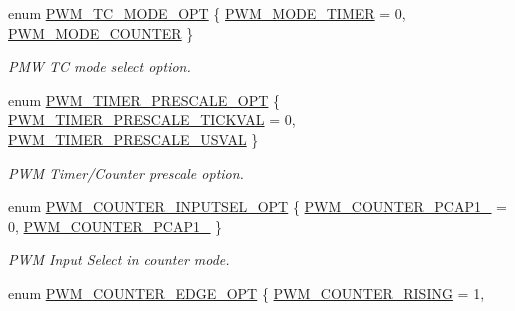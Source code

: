 \begin{DoxyCompactItemize}
\item 
enum \hyperlink{group___p_w_m___public___types_gae87a42c62d2f49cd3f54d2835a6e1446}{\-P\-W\-M\-\_\-\-T\-C\-\_\-\-M\-O\-D\-E\-\_\-\-O\-P\-T} \{ \hyperlink{group___p_w_m___public___types_ggae87a42c62d2f49cd3f54d2835a6e1446a739900357b775a3e1b5b50a3ebaca7ce}{\-P\-W\-M\-\_\-\-M\-O\-D\-E\-\_\-\-T\-I\-M\-E\-R} =  0, 
\hyperlink{group___p_w_m___public___types_ggae87a42c62d2f49cd3f54d2835a6e1446add660021612a2f19b863bc6498a5cd69}{\-P\-W\-M\-\_\-\-M\-O\-D\-E\-\_\-\-C\-O\-U\-N\-T\-E\-R}
 \}
\begin{DoxyCompactList}\small\item\em \-P\-M\-W \-T\-C mode select option. \end{DoxyCompactList}\item 
enum \hyperlink{group___p_w_m___public___types_ga76c67746a7dc431e243e5d8cf8859b0c}{\-P\-W\-M\-\_\-\-T\-I\-M\-E\-R\-\_\-\-P\-R\-E\-S\-C\-A\-L\-E\-\_\-\-O\-P\-T} \{ \hyperlink{group___p_w_m___public___types_gga76c67746a7dc431e243e5d8cf8859b0cad4f3d25b7dd87840d58758a4142eebd4}{\-P\-W\-M\-\_\-\-T\-I\-M\-E\-R\-\_\-\-P\-R\-E\-S\-C\-A\-L\-E\-\_\-\-T\-I\-C\-K\-V\-A\-L} =  0, 
\hyperlink{group___p_w_m___public___types_gga76c67746a7dc431e243e5d8cf8859b0caf27d9d800148dd203da235faa6029200}{\-P\-W\-M\-\_\-\-T\-I\-M\-E\-R\-\_\-\-P\-R\-E\-S\-C\-A\-L\-E\-\_\-\-U\-S\-V\-A\-L}
 \}
\begin{DoxyCompactList}\small\item\em \-P\-W\-M \-Timer/\-Counter prescale option. \end{DoxyCompactList}\item 
enum \hyperlink{group___p_w_m___public___types_gad89b9a422688a938a102b4b6b55c48a3}{\-P\-W\-M\-\_\-\-C\-O\-U\-N\-T\-E\-R\-\_\-\-I\-N\-P\-U\-T\-S\-E\-L\-\_\-\-O\-P\-T} \{ \hyperlink{group___p_w_m___public___types_ggad89b9a422688a938a102b4b6b55c48a3a55cda1ed5c79e14534e7d756f37d602d}{\-P\-W\-M\-\_\-\-C\-O\-U\-N\-T\-E\-R\-\_\-\-P\-C\-A\-P1\-\_} =  0, 
\hyperlink{group___p_w_m___public___types_ggad89b9a422688a938a102b4b6b55c48a3a62bcb23edfcaef345a952de63613544d}{\-P\-W\-M\-\_\-\-C\-O\-U\-N\-T\-E\-R\-\_\-\-P\-C\-A\-P1\-\_}
 \}
\begin{DoxyCompactList}\small\item\em \-P\-W\-M \-Input \-Select in counter mode. \end{DoxyCompactList}\item 
enum \hyperlink{group___p_w_m___public___types_gadf989578c354a90b57934758f01160e1}{\-P\-W\-M\-\_\-\-C\-O\-U\-N\-T\-E\-R\-\_\-\-E\-D\-G\-E\-\_\-\-O\-P\-T} \{ \hyperlink{group___p_w_m___public___types_ggadf989578c354a90b57934758f01160e1a09b86b1ed8affc13e859833e5f90bd81}{\-P\-W\-M\-\_\-\-C\-O\-U\-N\-T\-E\-R\-\_\-\-R\-I\-S\-I\-N\-G} =  1, 

\end{DoxyCompactItemize}
